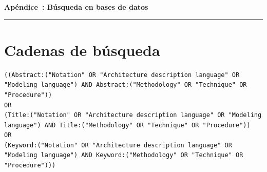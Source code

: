 

{}


\vspace{40pt}

{\centering \normalfont\huge\bfseries Apéndice~\thechapter: Búsqueda en bases de datos~\par}

\vspace{10pt}

{\centering \rule{\textwidth}{0.4pt} \par}

\vspace{40pt}




\FloatBarrier\section{Cadenas de búsqueda}\label{sec:cadenas-busqueda}


\begin{tcolorbox}[
	colback=gray!5,
	colframe=black!60,
	title=Cadena de búsqueda en ACM Full Text Collection para ``Metodología'',
	fonttitle=\bfseries,
	sharp corners=south
]
\scriptsize
\begin{lstlisting}[breaklines=true]
((Abstract:("Notation" OR "Architecture description language" OR "Modeling language") AND Abstract:("Methodology" OR "Technique" OR "Procedure")) 
OR
(Title:("Notation" OR "Architecture description language" OR "Modeling language") AND Title:("Methodology" OR "Technique" OR "Procedure")) 
OR
(Keyword:("Notation" OR "Architecture description language" OR "Modeling language") AND Keyword:("Methodology" OR "Technique" OR "Procedure")))
\end{lstlisting}
\end{tcolorbox}

